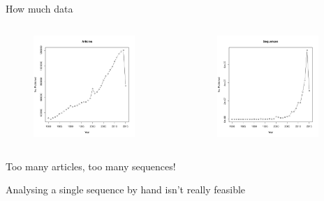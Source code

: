 \documentclass[pdf]{beamer}
\begin{document}
\begin{frame}{How much data}
  \begin{columns}
    \begin{column}{0.5\textwidth}
      \begin{figure}[ht]
        \includegraphics[width=0.9\textwidth]{images/article_counts}
      \end{figure}
    \end{column}
    \pause
    \begin{column}{0.5\textwidth}
      \begin{figure}[ht]
        \includegraphics[width=0.9\textwidth]{images/nucleotide_counts}
      \end{figure}
    \end{column}
  \end{columns}
  {\small
    Too many articles, too many sequences!
    \par
    Analysing a single sequence by hand isn't really feasible
  }
\end{frame}
\end{document}
